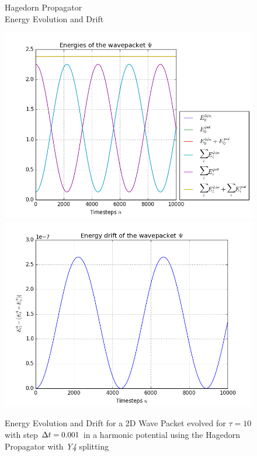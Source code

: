 \appendix

\begin{figure}
	\centered
	\begin{minipage}[c]{\textwidth}
		\centered
		\begin{center}
			\large Hagedorn Propagator \\[1mm]
			\normalsize Energy Evolution and Drift
			\vspace{4mm}
		\end{center}
	\end{minipage}
	\includegraphics[width=.45\textwidth]{figures/energy_Hagedorn.png}
	\includegraphics[width=.45\textwidth]{figures/drift_Hagedorn.png}
	\label{fig:energy_Hagedorn}
	\caption{Energy Evolution and Drift for a 2D Wave Packet evolved for $\tau = 10$ with step $\Delta t = 0.001$ in a harmonic potential using the Hagedorn Propagator with \emph{Y4} splitting}
\end{figure}

